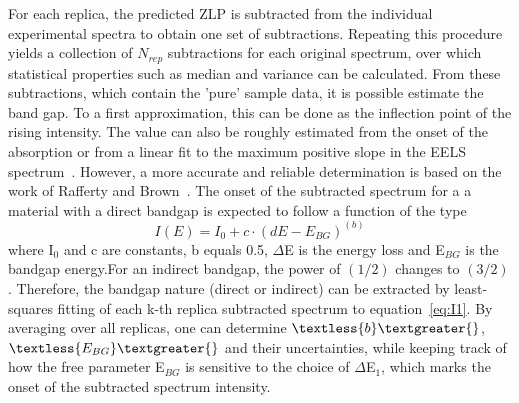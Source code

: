 For each replica, the predicted ZLP is subtracted from the individual 
experimental spectra to obtain one set of subtractions. 
Repeating this procedure yields a collection of $N_{rep}$ subtractions 
for each original spectrum, over which statistical properties such as 
median and variance can be calculated.\newline
%
From these subtractions, which contain the 'pure' sample data, 
it is possible estimate the band gap. To a first approximation,
this can be done as the inflection point of the rising intensity.
%
The value can also be roughly estimated from the onset of the absorption 
or from a linear fit to the maximum positive slope in the 
EELS spectrum~\cite{Schamm:2003}. 
%
However, a more accurate and reliable determination is based on the work of 
Rafferty and Brown~\cite{Rafferty:2000}. The onset of the subtracted spectrum 
for a a material with a direct bandgap is expected to follow a function of the type
\begin{equation}\label{eq:I1}
    I(E) = I_0 + c\cdot(dE-E_{BG})^{(b)}
\end{equation}
where I$_0$ and c are constants, b equals 0.5, $\Delta$E is the energy loss and E$_{BG}$ 
is the bandgap energy.For an indirect bandgap, the power of $(1/2)$ changes to $(3/2)$. 
%
Therefore, the bandgap nature (direct or indirect) can be extracted by 
least-squares fitting of each k-th replica subtracted spectrum to equation~\ref{eq:I1}.
%
By averaging over all replicas, one can determine $\textless{b}\textgreater{}$, 
$\textless{E_{BG}}\textgreater{}$ 
and their uncertainties, while keeping track of how the free parameter
E$_{BG}$ is sensitive to the choice of $\Delta$E$_1$, which marks the onset
of the subtracted spectrum intensity.
%

